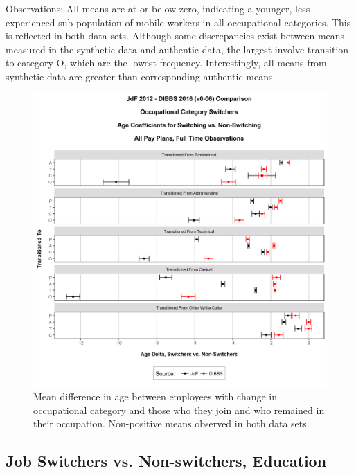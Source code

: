 \documentclass[10pt, letterpaper]{article}
\begin{document}
\begin{spacing}{1.0}
Observations:  All means are at or below zero, indicating a younger, less experienced sub-population of mobile workers in all occupational categories.  This is reflected in both data sets.  Although some discrepancies exist between means measured in the synthetic data and authentic data, the largest involve transition to category O, which are the lowest frequency.  Interestingly, all means from synthetic data are greater than corresponding authentic means.\\

\vspace{20pt}

\begin{figure}[h]
    \centering
    \includegraphics[width=6.5in, trim={0 0 0 1.5in}, clip]{OccCatTransitionVsNonTransAllPayPlansAge.png}
    \caption{Mean difference in age between employees with change in occupational category and those who they join and who remained in their occupation.  Non-positive means observed in both data sets.}
    \label{figure:OccCatTransitionVsNonTransAllPayPlansAge}
\end{figure}

\clearpage

\subsection{Job Switchers vs. Non-switchers, Education}


\end{spacing}
\end{document}
